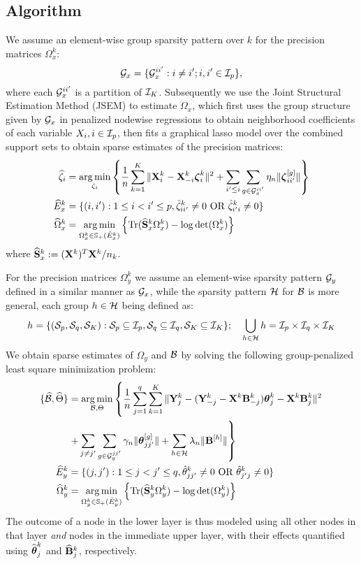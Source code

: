 \subsection{Algorithm}
We assume an element-wise group sparsity pattern over $k$ for the precision matrices $\Omega_x^k$:
%
\[
{\cal{G}}_x = \{ {\cal{G}}_x^{ii'}: i \neq i'; i, i' \in {\cal{I}}_p \},
\]
%
where each ${\cal{G}}_x^{ii'}$ is a partition of ${\cal{I}}_K$. Subsequently we use the Joint Structural Estimation Method (JSEM) \citep{MaMichailidis15} to estimate $\Omega_x$, which first uses the group structure given by ${\cal{G}}_x$ in penalized nodewise regressions \citep{MeisenBuhlmann06} to obtain neighborhood coefficients of each variable $X_i, i \in {\cal{I}}_p$, then fits a graphical lasso model over the combined support sets to obtain sparse estimates of the precision matrices:
%
\begin{align}\label{eqn:jsem-model}
\widehat \zeta_i &= \operatorname*{arg\,min}_{\zeta_i} \left\{
\frac{1}{n} \sum_{k=1}^K \| {\mathbf{X}}_i^k - {\mathbf{X}}_{-i}^k {\boldsymbol{\zeta}}_i^k \|^2 +
\sum_{i' \leq i} \sum_{g \in {\cal{G}}_x^{ii'}} \eta_n \| {\boldsymbol{\zeta}}_{ii'}^{[g]} \| \right\} \notag\\
\widehat E_x^k &= \{(i,i'): 1 \leq i < i' \leq p, \hat \zeta_{ii'}^k \neq 0 \text{ OR } \hat \zeta_{i'i}^k \neq 0 \}\notag\\
\widehat \Omega_x^k &= \operatorname*{arg\,min}_{\Omega_x^k \in {\mathbb{S}}_+ (\hat E_x^k)}
\left\{ \operatorname*{Tr} (\widehat {{\mathbf{S}}}_x^k \Omega_x^k ) - \log \det (\Omega_x^k) \right\}
\end{align}
%
where $\widehat {{\mathbf{S}}}_x^k := ({\mathbf{X}}^k)^T {\mathbf{X}}^k/n_k$.

For the precision matrices $\Omega_y^k$ we assume an element-wise sparsity pattern ${\cal{G}}_y$ defined in a similar manner as ${\cal{G}}_x$, while the sparsity pattern ${\cal{H}}$ for ${\cal{B}}$ is more general, each group $h \in {\cal{H}}$ being defined as:
%
$$
h = \{ ({\cal{S}}_p, {\cal{S}}_q, {\cal{S}}_K): {\cal{S}}_p \subseteq {\cal{I}}_p, {\cal{S}}_q \subseteq {\cal{I}}_q, {\cal{S}}_K \subseteq {\cal{I}}_K \}
; \quad \bigcup_{h \in {\cal{H}}} h = {\cal{I}}_p \times {\cal{I}}_q \times {\cal{I}}_K
$$
%
We obtain sparse estimates of $\Omega_y$ and ${\cal{B}}$ by solving the following group-penalized least square minimization problem:
%
\begin{align}
\{ \widehat {{\cal{B}}}, \widehat \Theta \} &= 
\operatorname*{arg\,min}_{{\cal{B}}, \Theta} \left\{ \frac{1}{n} \sum_{j=1}^q \sum_{k=1}^K \| {\mathbf{Y}}^k_j - ({\mathbf{Y}}_{-j}^k - {\mathbf{X}}^k {\mathbf{B}}_{-j}^k) {\boldsymbol{\theta}}_j^k - {\mathbf{X}}^k {\mathbf{B}}_j^k \|^2 \right. \notag\\
& \left. + \sum_{j \neq j'} \sum_{g \in {\cal{G}}_y^{jj'}} \gamma_n \| {\boldsymbol{\theta}}_{jj'}^{[g]} \| + \sum_{h \in {\cal{H}}} \lambda_n \| {\mathbf{B}}^{[h]} \| \right\} \label{eqn:jmmle-objfun}\\
\widehat E_y^k &= \{(j,j'): 1 \leq j < j' \leq q, \hat \theta_{jj'}^k \neq 0 \text{ OR } \hat \theta_{j'j}^k \neq 0 \}\notag\\
\widehat \Omega_y^k &= \operatorname*{arg\,min}_{\Omega_y^k \in {\mathbb{S}}_+ (\hat E_y^k)}
\left\{ \operatorname*{Tr} (\widehat {{\mathbf{S}}}_y^k \Omega_y^k ) - \log \det (\Omega_y^k) \right\} \label{eqn:omega-y-calc}
\end{align}
%
The outcome of a node in the lower layer is thus modeled using all other nodes in that layer {\it and} nodes in the immediate upper layer, with their effects quantified using $\widehat {{\boldsymbol{\theta}}}_j^k$ and $\widehat {{\mathbf{B}}}_j^k$, respectively.

